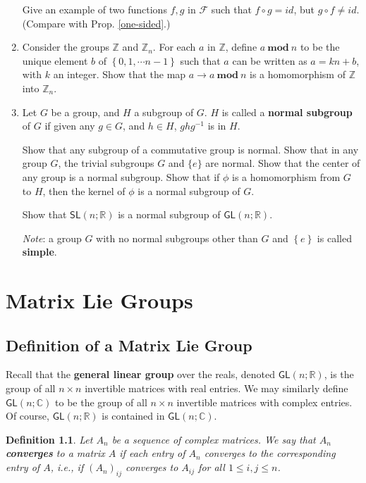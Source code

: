 \documentclass{amsbook}
\theoremstyle{plain}
\newtheorem{definition}[theorem]{Definition}
\numberwithin{equation}{chapter}
\numberwithin{theorem}{chapter}
\begin{document}
\begin{enumerate}
Give an example of two functions $f,g$ in $\mathcal{F}$ such that $f\circ
g=id$, but $g\circ f\neq id$. (Compare with Prop. \ref{one-sided}.)

\item \label{zmodn}Consider the groups $\mathbb{Z}$ and $\mathbb{Z}_{n}$. For
each $a$ in $\mathbb{Z}$, define $a\ \mathbf{mod\ }n$ to be the unique element
$b$ of $\left\{  0,1,\cdots n-1\right\}  $ such that $a$ can be written as
$a=kn+b$, with $k$ an integer. Show that the map $a\rightarrow
a\ \mathbf{mod\ }n$ is a homomorphism of $\mathbb{Z}$ into $\mathbb{Z}_{n}$.

\item  Let $G$ be a group, and $H$ a subgroup of $G$. $H$ is called a
\textbf{normal subgroup} of $G$ if given any $g\in G$, and $h\in H$,
$ghg^{-1}$ is in $H$.

Show that any subgroup of a commutative group is normal. Show that in any
group $G$, the trivial subgroups $G$ and $\{e\}$ are normal. Show that the
center of any group is a normal subgroup. Show that if $\phi$ is a
homomorphism from $G$ to $H$, then the kernel of $\phi$ is a normal subgroup
of $G$.

Show that $\mathsf{SL}(n;\mathbb{R})$ is a normal subgroup of $\mathsf{GL}%
(n;\mathbb{R})$.

\textit{Note}: a group $G$ with no normal subgroups other than $G$ and
$\left\{  e\right\}  $ is called \textbf{simple}.
\end{enumerate}

\chapter{Matrix Lie Groups}

\section{Definition of a Matrix Lie Group}

Recall that the \textbf{general linear group} over the reals, denoted
$\mathsf{GL}(n;\mathbb{R})$, is the group of all $n\times n$ invertible
matrices with real entries. We may similarly define $\mathsf{GL}%
(n;\mathbb{C})$ to be the group of all $n\times n$ invertible matrices with
complex entries. Of course, $\mathsf{GL}(n;\mathbb{R})$ is contained in
$\mathsf{GL}(n;\mathbb{C})$.

\begin{definition}
\label{matrix.converge}Let $A_{n}$ be a sequence of complex matrices. We say
that $A_{n}$ \textbf{converges} to a matrix $A$ if each entry of $A_{n}$
converges to the corresponding entry of $A$, i.e., if $\left(  A_{n}\right)
_{ij}$ converges to $A_{ij}$ for all $1\leq i,j\leq n$.
\end{definition}
\end{document}
